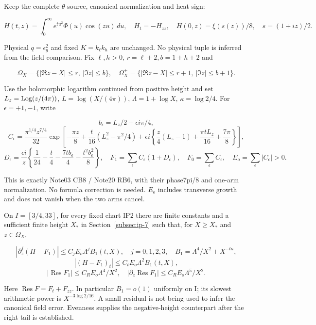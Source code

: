 Keep the complete \(\theta\) source, canonical normalization and heat sign:

\[
H(t,z)=\int_0^\infty e^{tu^2}\Phi(u)\cos(zu)\,du,
\quad H_t=-H_{zz},\quad H(0,z)=\xi(s(z))/8,\quad s=(1+iz)/2.
\tag{IP1}\label{eq:ansatz-ip1}
\]

Physical \(q=\epsilon_{g}^{2}\) and fixed \(K=k_{\ell} k_{h}\) are unchanged. No physical tuple is inferred from the field comparison. Fix \(\ell,h>0\), \(r=\ell+2,b=1+h+2\) and

\[
\Omega_X=\{|\Re z-X|\le r,\ |\Im z|\le b\},\quad
\Omega_X^+=\{|\Re z-X|\le r+1,\ |\Im z|\le b+1\}.
\tag{IP2}\label{eq:ansatz-ip2}
\]

Use the holomorphic logarithm continued from positive height and set \(L_{z}=\operatorname{Log}(z/(4\pi))\), \(L=\log(X/(4\pi))\), \(\Lambda=1+\log X\), \(\kappa=\log2/4\). For \(\epsilon=+1,-1\), write

\[
b_\epsilon=L_z/2+\epsilon i\pi/4,
\]
\[
C_\epsilon=\frac{\pi^{1/4}z^{7/4}}{32}
\exp\left[-\frac{\pi z}{8}+\frac t{16}(L_z^2-\pi^2/4)
 +\epsilon i\left\{\frac z4(L_z-1)+\frac{\pi tL_z}{16}
                         +\frac{7\pi}{8}\right\}\right],
\]
\[
D_\epsilon=\frac{\epsilon i}{z}
 \left\{\frac1{24}-\frac t4-\frac{7t b_\epsilon}{4}
                     -\frac{t^2 b_\epsilon^2}{8}\right\},\quad
F_1=\sum_\epsilon C_\epsilon(1+D_\epsilon),\quad
F_0=\sum_\epsilon C_\epsilon,\quad E_o=\sum_\epsilon|C_\epsilon|>0.
\tag{IP3}\label{eq:ansatz-ip3}
\]

This is exactly Note03 CB8 / Note20 RB6, with their phase7pi/8 and one-arm normalization. No formula correction is needed. \(E_{o}\) includes transverse growth and does not vanish when the two arms cancel.

\begin{theorem}\label{thm:intermediate-positive}
 On \(I=[3/4,33]\), for every fixed chart IP2 there are finite constants and a sufficient finite height \(X_*\) in Section~\ref{subsec:ip-7} such that, for \(X\ge X_*\) and \(z\in \Omega_X\),

\[
\boxed{|\partial_z^j(H-F_1)|\le C_jE_o\Lambda^j B_1(t,X),
\quad j=0,1,2,3,\quad B_1=\Lambda^4/X^2+X^{-t\kappa},}
\]
\[
\boxed{|(H-F_1)_t|\le C_tE_o\Lambda^2B_1(t,X),}
\]
\[
\boxed{|\operatorname{Res}F_1|\le C_RE_o\Lambda^4/X^2,\quad
|\partial_z\operatorname{Res}F_1|\le C_RE_o\Lambda^5/X^2.}
\tag{IP4}\label{eq:ansatz-ip4}
\]
\end{theorem}

Here \(\operatorname{Res} F=F_{t}+F_{zz}\). In particular \(B_{1}=o(1)\) uniformly on I; its slowest arithmetic power is \(X^{-3 \log2/16}\). A small residual is not being used to infer the canonical field error. Evenness supplies the negative-height counterpart after the right tail is established.

